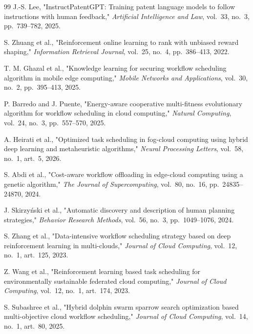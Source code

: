 \documentclass[12pt,a4paper]{report}
\begin{document}
\begin{thebibliography}{99}
J.-S. Lee, "InstructPatentGPT: Training patent language models to follow instructions with human feedback," \textit{Artificial Intelligence and Law}, vol.~33, no.~3, pp.~739--782, 2025.

S. Zhuang et al., "Reinforcement online learning to rank with unbiased reward shaping," \textit{Information Retrieval Journal}, vol.~25, no.~4, pp.~386--413, 2022.

T. M. Ghazal et al., "Knowledge learning for securing workflow scheduling algorithm in mobile edge computing," \textit{Mobile Networks and Applications}, vol.~30, no.~2, pp.~395--413, 2025.

P. Barredo and J. Puente, "Energy-aware cooperative multi-fitness evolutionary algorithm for workflow scheduling in cloud computing," \textit{Natural Computing}, vol.~24, no.~3, pp.~557--570, 2025.

A. Heirati et al., "Optimized task scheduling in fog-cloud computing using hybrid deep learning and metaheuristic algorithms," \textit{Neural Processing Letters}, vol.~58, no.~1, art.~5, 2026.

S. Abdi et al., "Cost-aware workflow offloading in edge-cloud computing using a genetic algorithm," \textit{The Journal of Supercomputing}, vol.~80, no.~16, pp.~24835--24870, 2024.

J. Skirzy{\'n}ski et al., "Automatic discovery and description of human planning strategies," \textit{Behavior Research Methods}, vol.~56, no.~3, pp.~1049--1076, 2024.

S. Zhang et al., "Data-intensive workflow scheduling strategy based on deep reinforcement learning in multi-clouds," \textit{Journal of Cloud Computing}, vol.~12, no.~1, art.~125, 2023.

Z. Wang et al., "Reinforcement learning based task scheduling for environmentally sustainable federated cloud computing," \textit{Journal of Cloud Computing}, vol.~12, no.~1, art.~174, 2023.

S. Subashree et al., "Hybrid dolphin swarm sparrow search optimization based multi-objective cloud workflow scheduling," \textit{Journal of Cloud Computing}, vol.~14, no.~1, art.~80, 2025.


\end{thebibliography}
\end{document}
